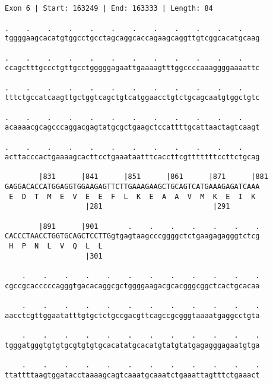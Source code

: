 \documentclass{article}
\begin{document}
\begin{Verbatim}
                                 
 
Exon 6 | Start: 163249 | End: 163333 | Length: 84
 
.    .    .    .    .    .    .    .    .    .    .    .    
tggggaagcacatgtggcctgcctagcaggcaccagaagcaggttgtcggcacatgcaag
                                                            
.    .    .    .    .    .    .    .    .    .    .    .    
ccagctttgccctgttgcctgggggagaattgaaaagtttggccccaaaggggaaaattc
                                                            
.    .    .    .    .    .    .    .    .    .    .    .    
tttctgccatcaagttgctggtcagctgtcatggaacctgtctgcagcaatgtggctgtc
                                                            
.    .    .    .    .    .    .    .    .    .    .    .    
acaaaacgcagcccaggacgagtatgcgctgaagctccattttgcattaactagtcaagt
                                                            
.    .    .    .    .    .    .    .    .    .    .    .    
acttacccactgaaaagcacttcctgaaataatttcaccttcgtttttttccttctgcag
                                                            
        |831      |841      |851      |861      |871      |881
GAGGACACCATGGAGGTGGAAGAGTTCTTGAAAGAAGCTGCAGTCATGAAAGAGATCAAA
 E  D  T  M  E  V  E  E  F  L  K  E  A  A  V  M  K  E  I  K 
                   |281                          |291       
  
        |891      |901       .    .    .    .    .    .    .
CACCCTAACCTGGTGCAGCTCCTTGgtgagtaagcccggggctctgaagagagggtctcg
 H  P  N  L  V  Q  L  L                                     
                   |301                                     
  
    .    .    .    .    .    .    .    .    .    .    .    .
cgccgcacccccagggtgacacaggcgctggggaagacgcacgggcggctcactgcacaa
                                                            
    .    .    .    .    .    .    .    .    .    .    .    .
aacctcgttggaatatttgtgctctgccgacgttcagccgcgggtaaaatgaggcctgta
                                                            
    .    .    .    .    .    .    .    .    .    .    .    .
tgggatgggtgtgtgcgtgtgtgcacatatgcacatgtatgtatgagagggagaatgtga
                                                            
    .    .    .    .    .    .    .    .    .    .    .    .
ttattttaagtggatacctaaaagcagtcaaatgcaaatctgaaattagtttctgaaact
                                                            

\end{Verbatim}
\end{document}
